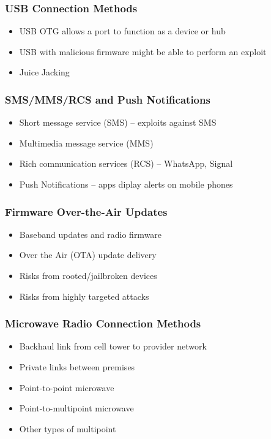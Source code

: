 		\subsubsection {USB Connection Methods}
			\begin{itemize}
				\item USB OTG allows a port to function as a device or hub
				\item USB with malicious firmware might be able to perform an exploit
				\item Juice Jacking
			\end{itemize}
		\subsubsection {SMS/MMS/RCS and Push Notifications}
			\begin{itemize}
				\item Short message service (SMS) -- exploits against SMS
				\item Multimedia message service (MMS)
				\item Rich communication services (RCS) -- WhatsApp, Signal
				\item Push Notifications -- apps diplay alerts on mobile phones
			\end{itemize}
		\subsubsection {Firmware Over-the-Air Updates}
			\begin{itemize}
				\item Baseband updates and radio firmware
				\item Over the Air (OTA) update delivery
				\item Risks from rooted/jailbroken devices
				\item Risks from highly targeted attacks
			\end{itemize}
		\subsubsection {Microwave Radio Connection Methods}
			\begin{itemize}
				\item Backhaul link from cell tower to provider network
				\item Private links between premises
				\item Point-to-point microwave
				\item Point-to-multipoint microwave
				\item Other types of multipoint
			\end{itemize}

